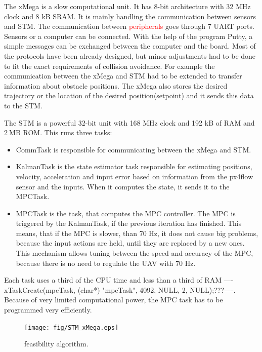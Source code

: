 \documentclass[a4paper,11pt,titlepage]{article}
\newcommand{\jed}[1]{\ensuremath{~\mathrm{#1}}}
\begin{document}
The xMega is a slow computational unit. It has 8-bit architecture with 32 MHz clock and 8 kB SRAM. It is mainly handling the communication between sensors and STM. The communication between \textcolor{red}{peripherals} goes through 7 UART ports. Sensors or a computer can be connected. With the help of the program Putty, a simple messages can be exchanged between the computer and the board. Most of the protocols have been already designed, but minor adjustments had to be done to fit the exact requirements of collision avoidance. For example the communication between the xMega and STM had to be extended to transfer information about obstacle positions. The xMega also stores the desired trajectory or the location of the desired position(setpoint) and it sends this data to the STM. 

The STM is a powerful 32-bit unit with 168 MHz clock and 192 kB of RAM and 2\jed{MB} ROM. This runs three tasks: 

\begin{itemize}
\item CommTask is responsible for communicating between the xMega and STM.

\item KalmanTask is the state estimator task responsible for estimating positions, velocity, acceleration and input error based on information from the px4flow sensor and the inputs. When it computes the state, it sends it to the MPCTask.

\item MPCTask is the task, that computes the MPC controller. The MPC is triggered by the KalmanTask, if the previous iteration has finished. This means, that if the MPC  is slower, than 70 Hz, it does not cause big problems, because the input actions are held, until they are replaced by a new ones. This mechanism allows tuning between the speed and accuracy of the MPC, because there is no need to regulate the UAV with 70 Hz.
\end{itemize}

Each task uses a third of the CPU time and less than a third of RAM ----xTaskCreate(mpcTask, (char*) "mpcTask", 4092, NULL, 2, NULL);???----. Because of very limited computational power, the MPC task has to be programmed very efficiently.

\begin{figure}[!ht]
\centering
\texttt{[image: fig/STM\_xMega.eps]}
\caption{feasibility algorithm.}
\label{fig:feasibility_algorithm}
\end{figure}
\end{document}
